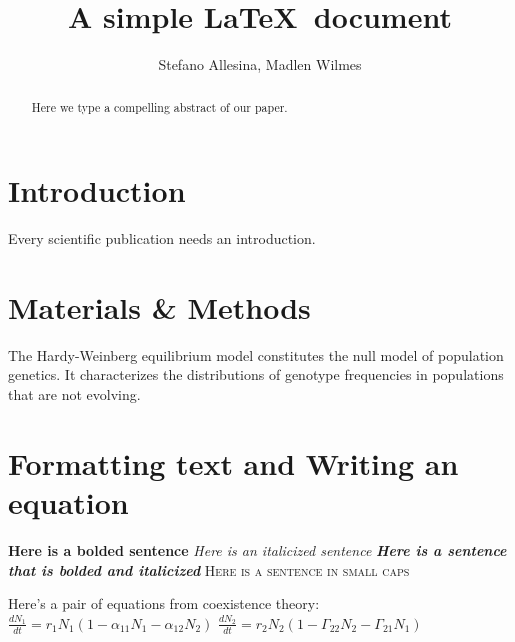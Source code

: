 \documentclass[12pt]{article}
\title{A simple \LaTeX\ document}
\author{Stefano Allesina, Madlen Wilmes}
\date{}
\begin{document}
\maketitle
\begin{abstract}
Here we type a compelling abstract of our paper.
\end{abstract}
\section{Introduction}
Every scientific publication needs an introduction.
\section{Materials \& Methods}
The Hardy-Weinberg equilibrium model constitutes the null model of population genetics. It characterizes the distributions of genotype  frequencies in populations that are not evolving.

\section{Formatting text and Writing an equation}

\textbf{Here is a bolded sentence}     
\newline
\textit{Here is an italicized sentence}     
\newline
\textit{\textbf{Here is a sentence that is bolded and italicized}}    
\newline
\textsc{Here is a sentence in small caps}   
\newline

Here's a pair of equations from coexistence theory:
\newline
$\frac{dN_{1}}{dt} = r_{1}N_{1} (1 - \alpha_{11}N_{1} - \alpha_{12}N_{2})$
$\frac{dN_{2}}{dt} = r_{2}N_{2} (1 - \Gamma_{22}N_{2} - \Gamma_{21}N_{1})$
\end{document}
